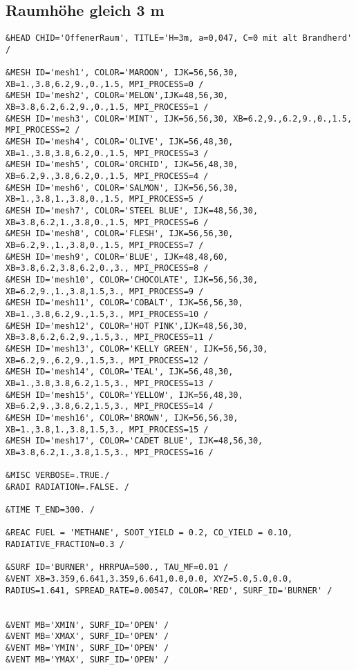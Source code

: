 \subsection*{Raumhöhe gleich 3 m}
\begin{lstlisting}[emptylines=0,basicstyle=\tiny]
&HEAD CHID='OffenerRaum', TITLE='H=3m, a=0,047, C=0 mit alt Brandherd' /

&MESH ID='mesh1', COLOR='MAROON', IJK=56,56,30, XB=1.,3.8,6.2,9.,0.,1.5, MPI_PROCESS=0 /
&MESH ID='mesh2', COLOR='MELON',IJK=48,56,30, XB=3.8,6.2,6.2,9.,0.,1.5, MPI_PROCESS=1 /
&MESH ID='mesh3', COLOR='MINT', IJK=56,56,30, XB=6.2,9.,6.2,9.,0.,1.5, MPI_PROCESS=2 /
&MESH ID='mesh4', COLOR='OLIVE', IJK=56,48,30, XB=1.,3.8,3.8,6.2,0.,1.5, MPI_PROCESS=3 /
&MESH ID='mesh5', COLOR='ORCHID', IJK=56,48,30, XB=6.2,9.,3.8,6.2,0.,1.5, MPI_PROCESS=4 /
&MESH ID='mesh6', COLOR='SALMON', IJK=56,56,30, XB=1.,3.8,1.,3.8,0.,1.5, MPI_PROCESS=5 /
&MESH ID='mesh7', COLOR='STEEL BLUE', IJK=48,56,30, XB=3.8,6.2,1.,3.8,0.,1.5, MPI_PROCESS=6 /
&MESH ID='mesh8', COLOR='FLESH', IJK=56,56,30, XB=6.2,9.,1.,3.8,0.,1.5, MPI_PROCESS=7 /
&MESH ID='mesh9', COLOR='BLUE', IJK=48,48,60, XB=3.8,6.2,3.8,6.2,0.,3., MPI_PROCESS=8 /
&MESH ID='mesh10', COLOR='CHOCOLATE', IJK=56,56,30, XB=6.2,9.,1.,3.8,1.5,3., MPI_PROCESS=9 /
&MESH ID='mesh11', COLOR='COBALT', IJK=56,56,30, XB=1.,3.8,6.2,9.,1.5,3., MPI_PROCESS=10 /
&MESH ID='mesh12', COLOR='HOT PINK',IJK=48,56,30, XB=3.8,6.2,6.2,9.,1.5,3., MPI_PROCESS=11 /
&MESH ID='mesh13', COLOR='KELLY GREEN', IJK=56,56,30, XB=6.2,9.,6.2,9.,1.5,3., MPI_PROCESS=12 /
&MESH ID='mesh14', COLOR='TEAL', IJK=56,48,30, XB=1.,3.8,3.8,6.2,1.5,3., MPI_PROCESS=13 /
&MESH ID='mesh15', COLOR='YELLOW', IJK=56,48,30, XB=6.2,9.,3.8,6.2,1.5,3., MPI_PROCESS=14 /
&MESH ID='mesh16', COLOR='BROWN', IJK=56,56,30, XB=1.,3.8,1.,3.8,1.5,3., MPI_PROCESS=15 /
&MESH ID='mesh17', COLOR='CADET BLUE', IJK=48,56,30, XB=3.8,6.2,1.,3.8,1.5,3., MPI_PROCESS=16 /

&MISC VERBOSE=.TRUE./
&RADI RADIATION=.FALSE. /

&TIME T_END=300. /

&REAC FUEL = 'METHANE', SOOT_YIELD = 0.2, CO_YIELD = 0.10, RADIATIVE_FRACTION=0.3 /

&SURF ID='BURNER', HRRPUA=500., TAU_MF=0.01 /
&VENT XB=3.359,6.641,3.359,6.641,0.0,0.0, XYZ=5.0,5.0,0.0, RADIUS=1.641, SPREAD_RATE=0.00547, COLOR='RED', SURF_ID='BURNER' /


&VENT MB='XMIN', SURF_ID='OPEN' /  
&VENT MB='XMAX', SURF_ID='OPEN' /  
&VENT MB='YMIN', SURF_ID='OPEN' /  
&VENT MB='YMAX', SURF_ID='OPEN' / 
 

\end{lstlisting}
